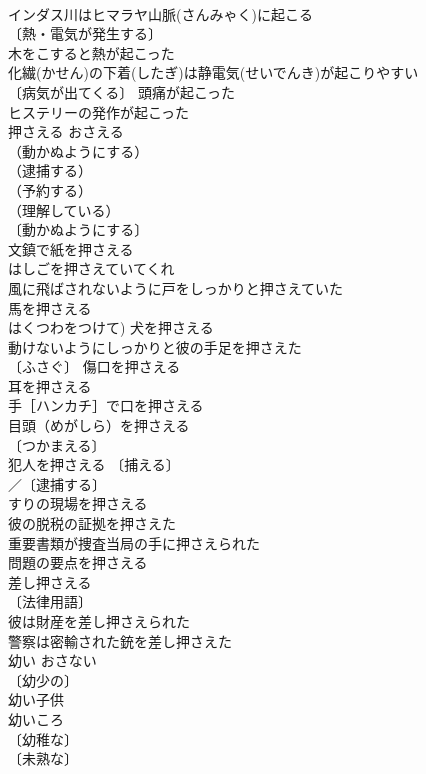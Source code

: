 \documentclass[8pt]{extreport}
\begin{document}
\begin{CJK}{UTF8}{min}
\\	インダス川はヒマラヤ山脈(さんみゃく)に起こる 
\\	〔熱・電気が発生する〕
\\	木をこすると熱が起こった 
\\	化繊(かせん)の下着(したぎ)は静電気(せいでんき)が起こりやすい 
\\	〔病気が出てくる〕 頭痛が起こった 
\\	ヒステリーの発作が起こった 
\\	押さえる	おさえる	
\\	（動かぬようにする）
\\	（逮捕する）
\\	（予約する）
\\	（理解している）
\\	〔動かぬようにする〕
\\	文鎮で紙を押さえる 
\\	はしごを押さえていてくれ 
\\	風に飛ばされないように戸をしっかりと押さえていた 
\\	馬を押さえる 
\\	はくつわをつけて) 犬を押さえる 
\\	動けないようにしっかりと彼の手足を押さえた 
\\	〔ふさぐ〕 傷口を押さえる 
\\	耳を押さえる 
\\	手［ハンカチ］で口を押さえる 
\\	目頭（めがしら）を押さえる 
\\	〔つかまえる〕
\\	犯人を押さえる 〔捕える〕
\\	／〔逮捕する〕
\\	すりの現場を押さえる 
\\	彼の脱税の証拠を押さえた 
\\	重要書類が捜査当局の手に押さえられた 
\\	問題の要点を押さえる 
\\	差し押さえる 
\\	〔法律用語〕
\\	彼は財産を差し押さえられた 
\\	警察は密輸された銃を差し押さえた 
\\	幼い	おさない	
\\	〔幼少の〕
\\	幼い子供 
\\	幼いころ 
\\	〔幼稚な〕
\\	〔未熟な〕

\end{CJK}
\end{document}
